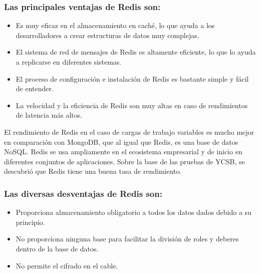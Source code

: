 \documentclass[twoside,twocolumn]{article}
\begin{document}
\subsubsection{Las principales ventajas de Redis son:}
\begin{itemize}
    \item   Es muy eficaz en el almacenamiento en caché, lo que ayuda a los desarrolladores a crear estructuras de datos muy complejas.
    \item	El sistema de red de mensajes de Redis es altamente eficiente, lo que lo ayuda a replicarse en diferentes sistemas.
    \item	El proceso de configuración e instalación de Redis es bastante simple y fácil de entender.
    \item	La velocidad y la eficiencia de Redis son muy altas en caso de rendimientos de latencia más altos.
    
\end{itemize}
El rendimiento de Redis en el caso de cargas de trabajo variables
es mucho mejor en comparación con MongoDB, que al igual que Redis,
 es una base de datos NoSQL. Redis se usa ampliamente en el ecosistema
  empresarial y de inicio en diferentes conjuntos de aplicaciones. Sobre
   la base de las pruebas de YCSB, se descubrió que Redis tiene una buena 
   tasa de rendimiento.


\subsubsection{Las diversas desventajas de Redis son:}
\begin{itemize}
    \item   Proporciona almacenamiento obligatorio a todos los datos dados debido a su principio.
    \item	No proporciona ninguna base para facilitar la división de roles y deberes dentro de la base de datos.
    \item	No permite el cifrado en el cable.
    
\end{itemize}
\end{document}
